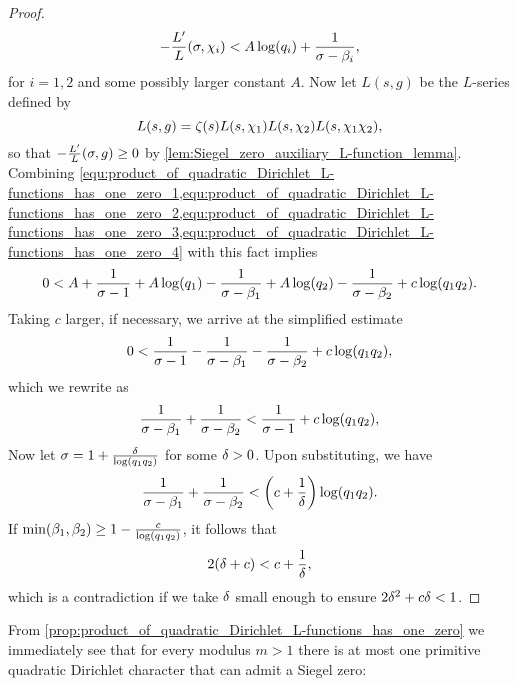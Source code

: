 \begin{proof}
        \begin{equation}\label{equ:product_of_quadratic_Dirichlet_L-functions_has_one_zero_4}
          -\frac{L'}{L}(\sigma,\chi_{i}) < A\log(q_{i})+\frac{1}{\sigma-\beta_{i}},
        \end{equation}
        for $i = 1,2$ and some possibly larger constant $A$. Now let $L(s,g)$ be the $L$-series defined by
        \[
          L(s,g) = \zeta(s)L(s,\chi_{1})L(s,\chi_{2})L(s,\chi_{1}\chi_{2}),
        \]
        so that $-\frac{L'}{L}(\sigma,g) \ge 0$ by \cref{lem:Siegel_zero_auxiliary_L-function_lemma}. Combining \cref{equ:product_of_quadratic_Dirichlet_L-functions_has_one_zero_1,equ:product_of_quadratic_Dirichlet_L-functions_has_one_zero_2,equ:product_of_quadratic_Dirichlet_L-functions_has_one_zero_3,equ:product_of_quadratic_Dirichlet_L-functions_has_one_zero_4} with this fact implies
        \[
        0 < A+\frac{1}{\sigma-1}+A\log(q_{1})-\frac{1}{\sigma-\beta_{1}}+A\log(q_{2})-\frac{1}{\sigma-\beta_{2}}+c\log(q_{1}q_{2}).
        \]
        Taking $c$ larger, if necessary, we arrive at the simplified estimate
        \[
          0 < \frac{1}{\sigma-1}-\frac{1}{\sigma-\beta_{1}}-\frac{1}{\sigma-\beta_{2}}+c\log(q_{1}q_{2}),
        \]
        which we rewrite as
        \[
          \frac{1}{\sigma-\beta_{1}}+\frac{1}{\sigma-\beta_{2}} < \frac{1}{\sigma-1}+c\log(q_{1}q_{2}),
        \]
        Now let $\sigma = 1+\frac{\delta}{\log(q_{1}q_{2})}$ for some $\delta > 0$. Upon substituting, we have
        \[
          \frac{1}{\sigma-\beta_{1}}+\frac{1}{\sigma-\beta_{2}} < \left(c+\frac{1}{\delta}\right)\log(q_{1}q_{2}).
        \]
        If $\min(\beta_{1},\beta_{2}) \ge 1-\frac{c}{\log(q_{1}q_{2})}$, it follows that
        \[
          2(\delta+c) < c+\frac{1}{\delta},
        \]
        which is a contradiction if we take $\delta$ small enough to ensure $2\delta^{2}+c\delta < 1$.
      \end{proof}
    
      From \cref{prop:product_of_quadratic_Dirichlet_L-functions_has_one_zero} we immediately see that for every modulus $m > 1$ there is at most one primitive quadratic Dirichlet character that can admit a Siegel zero:

